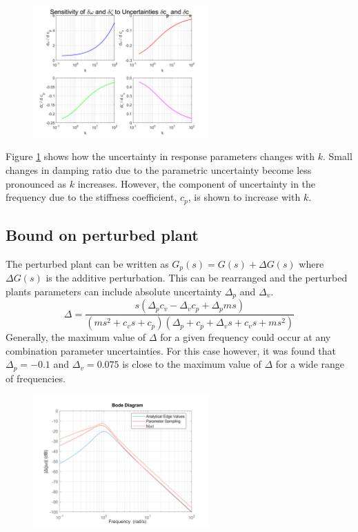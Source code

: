 \documentclass{article}
\begin{document}
\begin{figure}[H]
    \centering
    \includegraphics[width=0.6\textwidth]{figures/u_propagation.png}
    \caption{}
    \label{fig:u_propagation}
\end{figure}
Figure \ref{fig:u_propagation} shows how the uncertainty in response parameters changes with $k$.
Small changes in damping ratio due to the parametric uncertainty become less pronounced as $k$ increases.
However, the component of uncertainty in the frequency due to the stiffness coefficient, $c_p$, is shown to increase with $k$.

\subsection{Bound on perturbed plant}

The perturbed plant can be written as $G_p(s) = G(s) + \Delta G(s)$ where $\Delta G(s)$ is the additive perturbation.
This can be rearranged and the perturbed plants parameters can include absolute uncertainty $\Delta_p$ and $\Delta_v$.
\begin{equation}
    \Delta = \frac{s\left(\Delta_p c_v - \Delta_v c_p + \Delta_p m s\right)}
    {\left(m s^2 + c_v s + c_p\right)\left(\Delta_p + c_p + \Delta_v s + c_v s + m s^2\right)}    
    \label{eq:analytical_delta}
\end{equation}
Generally, the maximum value of $\Delta$ for a given frequency could occur at any combination parameter uncertainties.
For this case however, it was found that $\Delta_p = -0.1$ and $\Delta_v = 0.075$ is close to the maximum value of $\Delta$ for a wide range of frequencies.

\begin{figure}[H]
    \centering
    \includegraphics[width=0.6\textwidth]{figures/1_tight_bound.png}
    \caption{}
    \label{fig:bode_Gp}
\end{figure}
\end{document}
